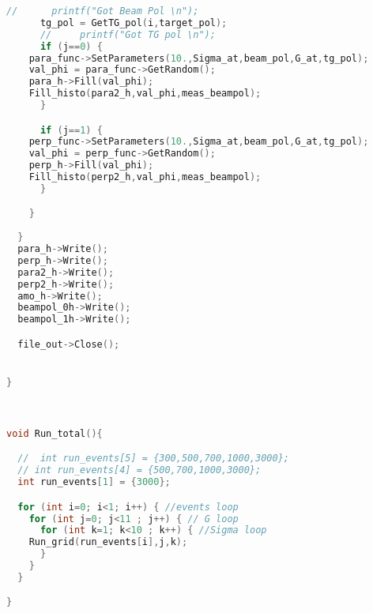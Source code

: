 \begin{lstlisting}[language=C++]
      //      printf("Got Beam Pol \n");
      tg_pol = GetTG_pol(i,target_pol);
      //     printf("Got TG pol \n");
      if (j==0) {
	para_func->SetParameters(10.,Sigma_at,beam_pol,G_at,tg_pol);
	val_phi = para_func->GetRandom();
	para_h->Fill(val_phi);
	Fill_histo(para2_h,val_phi,meas_beampol);
      }

      if (j==1) {
	perp_func->SetParameters(10.,Sigma_at,beam_pol,G_at,tg_pol);
	val_phi = perp_func->GetRandom();
	perp_h->Fill(val_phi);
	Fill_histo(perp2_h,val_phi,meas_beampol);
      }

    }
    
  }
  para_h->Write();
  perp_h->Write();
  para2_h->Write();
  perp2_h->Write();
  amo_h->Write();
  beampol_0h->Write();
  beampol_1h->Write();

  file_out->Close();


}



void Run_total(){

  //  int run_events[5] = {300,500,700,1000,3000};
  // int run_events[4] = {500,700,1000,3000};
  int run_events[1] = {3000};

  for (int i=0; i<1; i++) { //events loop 
    for (int j=0; j<11 ; j++) { // G loop
      for (int k=1; k<10 ; k++) { //Sigma loop
	Run_grid(run_events[i],j,k);
      }
    }
  }

}


  
\end{lstlisting}


